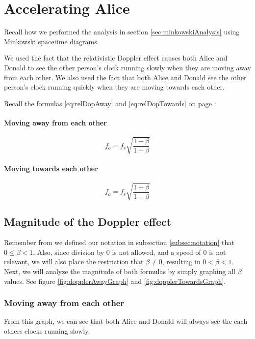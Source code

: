 \section{Accelerating Alice}\label{sec:acceleratingAlice}
	Recall how we performed the analysis in section \vref{sec:minkowskiAnalysis} using Minkowski spacetime diagrams.

	We used the fact that the relativistic Doppler effect causes both Alice and Donald to see the other person's clock running slowly when they are moving away from each other.
	We also used the fact that both Alice and Donald see the other person's clock running quickly when they are moving towards each other.

	Recall the formulas \eqref{eq:relDopAway} and \eqref{eq:relDopTowards} on page \pageref{eq:relDopAway}:
	\begin{samepagecols}{2}
		\paragraph{Moving away from each other}
		\begin{equation*}
			f_o = f_s \sqrt{\frac{1 - \beta}{1 + \beta}}
		\end{equation*}
		\paragraph{Moving towards each other}
		\begin{equation*}
			f_o = f_s \sqrt{\frac{1 + \beta}{1 - \beta}}
		\end{equation*}
	\end{samepagecols}
	\subsection{Magnitude of the Doppler effect}\label{subsec:dopMagnitude}
		Remember from we defined our notation in subsection \vref{subsec:notation} that $0 \leq \beta < 1$. Also, since division by 0 is not allowed, and a speed of 0 is not relevant, we will also place the restriction that $\beta \neq 0$, resulting in $0 < \beta < 1$.
		Next, we will analyze the magnitude of both formulas by simply graphing all $\beta$ values.
		See figure \ref{fig:dopplerAwayGraph} and \vref{fig:dopplerTowardsGraph}.
		\newpage
		\subsubsection{Moving away from each other}
			
			From this graph, we can see that both Alice and Donald will always see the each others clocks running slowly.
